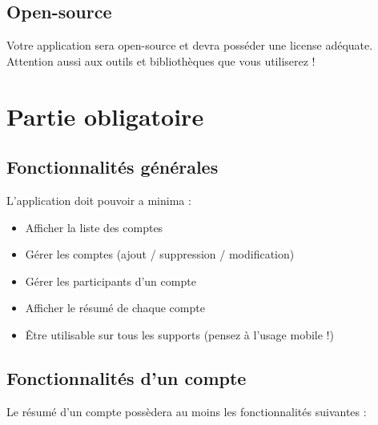 \documentclass{42-fr}
\begin{document}

	\section{Open-source}
		Votre application sera open-source et devra poss\'eder une license ad\'equate.
		Attention aussi aux outils et bibliothèques que vous utiliserez !



\chapter{Partie obligatoire}


    \section{Fonctionnalit\'es g\'en\'erales}

        L'application doit pouvoir a minima :\\

        \begin{itemize}\itemsep1pt
            \item Afficher la liste des comptes
			\item G\'erer les comptes (ajout / suppression / modification)
            \item G\'erer les participants d'un compte
			\item Afficher le résumé de chaque compte
			\item \^Etre utilisable sur tous les supports (pensez \`a l'usage mobile !)
        \end{itemize}


    \section{Fonctionnalit\'es d'un compte}

        Le r\'esum\'e d'un compte poss\`edera au moins les fonctionnalit\'es suivantes :\\
\end{document}
